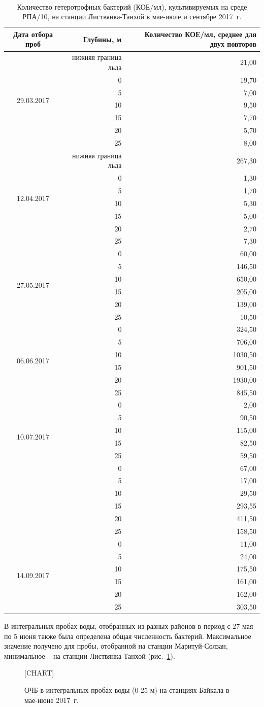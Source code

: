 \documentclass[a4paper,12pt,openany,final]{extreport}
\def\oldcaption{} \let\oldcaption=\caption
\def\caption{\stepcounter{captionsnum}\oldcaption}
\newcommand\T{\rule{0pt}{2.6ex}}       %
\newcommand{\BC}[2]{%
  \begin{minipage}[c]{#1}
    \raggedright\T
    #2
  \end{minipage}
}
\begin{document}
\begin{table}
\caption{Количество гетеротрофных бактерий (КОЕ/мл), культивируемых на
среде РПА/10, на станции Листвянка-Танхой в мае-июле и сентябре 2017~г.}\label{table:2}

{\tt\small%
  \begin{tabular*}{\textwidth}{|c|r|@{\extracolsep{\fill}}r|}
\hline
\rm Дата отбора проб & \BC{4cm}{\centering\rm Глубины, м} & \BC{0.45\textwidth}{\rm\centering Количество КОЕ/мл, среднее для двух
повторов}\\
\hline
\multirow{7}{*}{29.03.2017} & \rm нижняя граница льда & 21,00\tabularnewline
& 0 & 19,70\tabularnewline
& 5 & 7,00\tabularnewline
& 10 & 9,50\tabularnewline
& 15 & 7,70\tabularnewline
& 20 & 5,70\tabularnewline
  & 25 & 8,00\tabularnewline
         \hline
\multirow{7}{*}{12.04.2017} & \rm нижняя граница льда & 267,30\tabularnewline
& 0 & 1,30\tabularnewline
& 5 & 1,70\tabularnewline
& 10 & 5,30\tabularnewline
& 15 & 5,00\tabularnewline
& 20 & 2,70\tabularnewline
  & 25 & 7,30\tabularnewline
         \hline
\multirow{6}{*}{27.05.2017} & 0 & 60,00\tabularnewline
& 5 & 146,50\tabularnewline
& 10 & 650,00\tabularnewline
& 15 & 205,00\tabularnewline
& 20 & 139,00\tabularnewline
& 25 & 10,50\tabularnewline
         \hline
\multirow{6}{*}{06.06.2017} & 0 & 324,50\tabularnewline
& 5 & 706,00\tabularnewline
& 10 & 1030,50\tabularnewline
& 15 & 901,50\tabularnewline
& 20 & 1930,00\tabularnewline
& 25 & 845,50\tabularnewline
         \hline
\multirow{6}{*}{10.07.2017} & 0 & 2,00\tabularnewline
& 5 & 90,50\tabularnewline
& 10 & 115,00\tabularnewline
& 15 & 82,50\tabularnewline
& 25 & 59,50\tabularnewline
         \hline
\multirow{6}{*}{03.09.2017} & 0 & 67,00\tabularnewline
& 5 & 17,00\tabularnewline
& 10 & 29,50\tabularnewline
& 15 & 293,55\tabularnewline
& 20 & 411,50\tabularnewline
& 25 & 158,50\tabularnewline
         \hline
\multirow{6}{*}{14.09.2017} & 0 & 11,00\tabularnewline
& 5 & 24,00\tabularnewline
& 10 & 175,50\tabularnewline
& 15 & 161,00\tabularnewline
& 20 & 162,00\tabularnewline
& 25 & 303,50\tabularnewline
\hline
\end{tabular*}}
\end{table}

В интегральных пробах воды, отобранных из разных районов в период с 27
мая по 5 июня также была определена общая численность бактерий.
Максимальное значение получено для пробы, отобранной на станции
Маритуй-Солзан, минимальное -- на станции Листвянка-Танхой (рис.~\ref{fig:chart}).

\begin{figure}
  \centering
{{[}CHART{]}}
\caption{ОЧБ в интегральных пробах воды (0-25 м) на станциях Байкала в
мае-июне 2017~г.}\label{fig:chart}
\end{figure}
\end{document}
